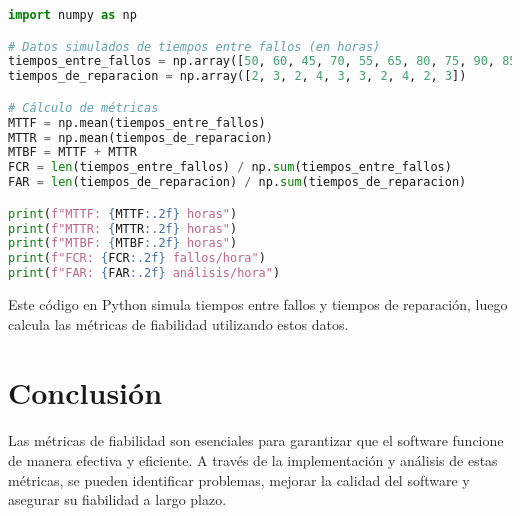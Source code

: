 \documentclass[a4,10pt]{article}
\begin{document}
\begin{lstlisting}[language=Python, caption=Cálculo de Métricas de Fiabilidad en Python]
import numpy as np

# Datos simulados de tiempos entre fallos (en horas)
tiempos_entre_fallos = np.array([50, 60, 45, 70, 55, 65, 80, 75, 90, 85])
tiempos_de_reparacion = np.array([2, 3, 2, 4, 3, 3, 2, 4, 2, 3])

# Cálculo de métricas
MTTF = np.mean(tiempos_entre_fallos)
MTTR = np.mean(tiempos_de_reparacion)
MTBF = MTTF + MTTR
FCR = len(tiempos_entre_fallos) / np.sum(tiempos_entre_fallos)
FAR = len(tiempos_de_reparacion) / np.sum(tiempos_de_reparacion)

print(f"MTTF: {MTTF:.2f} horas")
print(f"MTTR: {MTTR:.2f} horas")
print(f"MTBF: {MTBF:.2f} horas")
print(f"FCR: {FCR:.2f} fallos/hora")
print(f"FAR: {FAR:.2f} análisis/hora")
\end{lstlisting}

Este código en Python simula tiempos entre fallos y tiempos de reparación, luego calcula las métricas de fiabilidad utilizando estos datos.

\section{Conclusión}
Las métricas de fiabilidad son esenciales para garantizar que el software funcione de manera efectiva y eficiente. A través de la implementación y análisis de estas métricas, se pueden identificar problemas, mejorar la calidad del software y asegurar su fiabilidad a largo plazo.

\printbibliography
\end{document}
